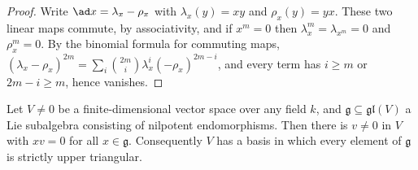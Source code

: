 \begin{proof}
Write $\ad x = \lambda_x - \rho_x$ with $\lambda_x(y) = xy$ and $\rho_x(y) = yx$. These two linear maps commute, by associativity, and if $x^m = 0$ then
$\lambda_x^m = \lambda_{x^m} = 0$ and $\rho_x^m = 0$. By the binomial formula for commuting maps, $(\lambda_x - \rho_x)^{2m} = \sum_i\binom{2m}{i}\lambda_x^i(-\rho_x)^{2m - i}$,
and every term has $i \geq m$ or $2m - i \geq m$, hence vanishes.
\end{proof}

\begin{theorem}\label{representation-theory:theorem-engel-linear}
Let $V \neq 0$ be a finite-dimensional vector space over any field $k$, and $\mathfrak{g} \subseteq \mathfrak{gl}(V)$ a Lie subalgebra consisting of nilpotent
endomorphisms. Then there is $v \neq 0$ in $V$ with $xv = 0$ for all $x \in \mathfrak{g}$. Consequently $V$ has a basis in which every element of $\mathfrak{g}$ is
strictly upper triangular.
\end{theorem}

